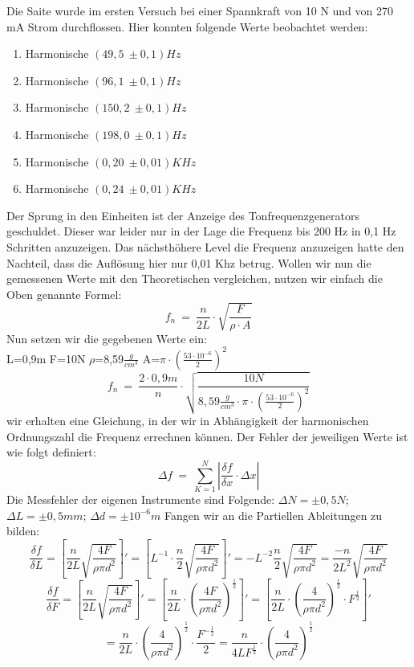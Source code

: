 \documentclass[11pt, a4Paper]{article}
\begin{document}
Die Saite wurde im ersten Versuch bei einer Spannkraft von 10 N und von 270 mA Strom durchflossen. Hier konnten folgende Werte beobachtet werden:\\
\begin{enumerate}
\item Harmonische $(49,5\ \pm 0,1) Hz$
\item Harmonische $(96,1\ \pm 0,1) Hz$
\item Harmonische $(150,2\ \pm 0,1) Hz$
\item Harmonische $(198,0\ \pm 0,1) Hz$
\item Harmonische $(0,20\ \pm 0,01) KHz$ 
\item Harmonische $(0,24\ \pm 0,01) KHz$
\end{enumerate}
Der Sprung in den Einheiten ist der Anzeige des Tonfrequenzgenerators geschuldet. Dieser war leider nur in der Lage die Frequenz bis 200 Hz in 0,1 Hz Schritten anzuzeigen. Das nächsthöhere Level die Frequenz anzuzeigen hatte den Nachteil, dass die Auflösung hier nur 0,01 Khz betrug. Wollen wir nun die gemessenen Werte mit den Theoretischen vergleichen, nutzen wir einfach die Oben genannte Formel: $$f_n\ =\ \frac{n}{2L}\cdot\sqrt{\frac{F}{\rho\cdot A}}$$ Nun setzen wir die gegebenen Werte ein:\\ L=0,9m F=10N $\rho$=8,59$\frac{g}{cm^3}$ A=$\pi\cdot (\frac{53\cdot 10^{-6}}{2 })^2$ $$f_n\ =\ \frac{2\cdot 0,9m}{n}\cdot\sqrt{\frac{10N}{8,59\frac{g}{cm^3}\cdot \pi\cdot (\frac{53\cdot 10^{-6}}{2 })^2}}$$ wir erhalten eine Gleichung, in der wir in Abhängigkeit der harmonischen Ordnungszahl die Frequenz errechnen können. Der Fehler der jeweiligen Werte ist wie folgt definiert: $$\Delta f\ =\ \sum \limits_{K=1}^{N} \left| \frac{\delta f}{\delta x}\cdot \Delta x \right|$$ Die Messfehler der eigenen Instrumente sind Folgende: $\Delta N = \pm 0,5N$; $\Delta L = \pm 0,5 mm $; $\Delta d = \pm 10^{-6}m$
Fangen wir an die Partiellen Ableitungen zu bilden: 
$$\frac{\delta f}{\delta L}=\left[\frac{n}{2L}\sqrt{\frac{4F}{\rho\pi d^2}} \right]'=\left[L^{-1}\cdot \frac{n}{2}\sqrt{\frac{4F}{\rho\pi d^2}} \right]'=-L^{-2}\frac{n}{2}\sqrt{\frac{4F}{\rho\pi d^2}} = \frac{-n}{2L^2}\sqrt{\frac{4F}{\rho\pi d^2}}$$ 
$$\frac{\delta f}{\delta F}=\left[\frac{n}{2L}\sqrt{\frac{4F}{\rho\pi d^2}} \right]'=\left[\frac{n}{2L}\cdot(\frac{4F}{\rho\pi d^2})^{\frac{1}{2}} \right]' =\left[\frac{n}{2L}\cdot(\frac{4}{\rho\pi d^2})^{\frac{1}{2}}\cdot F^{\frac{1}{2}} \right]'$$ $$ =\frac{n}{2L}\cdot(\frac{4}{\rho\pi d^2})^{\frac{1}{2}}\cdot \frac{F^{-\frac{1}{2}}}{2} =\frac{n}{4LF^{\frac{1}{2}}}\cdot(\frac{4}{\rho\pi d^2})^{\frac{1}{2}}$$
\end{document}
